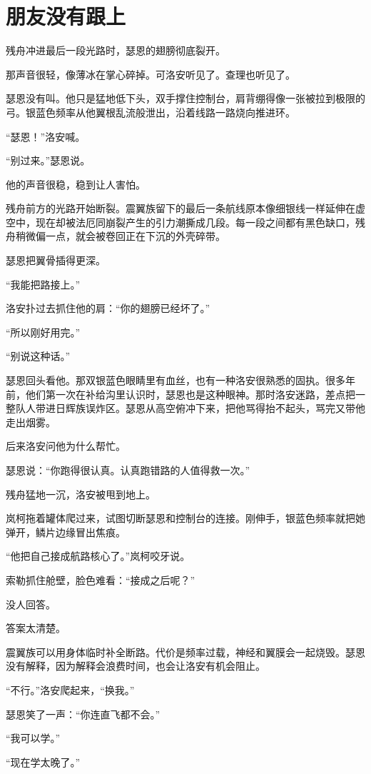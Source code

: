 \chapter{朋友没有跟上}

残舟冲进最后一段光路时，瑟恩的翅膀彻底裂开。

那声音很轻，像薄冰在掌心碎掉。可洛安听见了。查理也听见了。

瑟恩没有叫。他只是猛地低下头，双手撑住控制台，肩背绷得像一张被拉到极限的弓。银蓝色频率从他翼根乱流般泄出，沿着线路一路烧向推进环。

“瑟恩！”洛安喊。

“别过来。”瑟恩说。

他的声音很稳，稳到让人害怕。

残舟前方的光路开始断裂。震翼族留下的最后一条航线原本像细银线一样延伸在虚空中，现在却被法厄同崩裂产生的引力潮撕成几段。每一段之间都有黑色缺口，残舟稍微偏一点，就会被卷回正在下沉的外壳碎带。

瑟恩把翼骨插得更深。

“我能把路接上。”

洛安扑过去抓住他的肩：“你的翅膀已经坏了。”

“所以刚好用完。”

“别说这种话。”

瑟恩回头看他。那双银蓝色眼睛里有血丝，也有一种洛安很熟悉的固执。很多年前，他们第一次在补给沟里认识时，瑟恩也是这种眼神。那时洛安迷路，差点把一整队人带进日辉族误炸区。瑟恩从高空俯冲下来，把他骂得抬不起头，骂完又带他走出烟雾。

后来洛安问他为什么帮忙。

瑟恩说：“你跑得很认真。认真跑错路的人值得救一次。”

残舟猛地一沉，洛安被甩到地上。

岚柯拖着罐体爬过来，试图切断瑟恩和控制台的连接。刚伸手，银蓝色频率就把她弹开，鳞片边缘冒出焦痕。

“他把自己接成航路核心了。”岚柯咬牙说。

索勒抓住舱壁，脸色难看：“接成之后呢？”

没人回答。

答案太清楚。

震翼族可以用身体临时补全断路。代价是频率过载，神经和翼膜会一起烧毁。瑟恩没有解释，因为解释会浪费时间，也会让洛安有机会阻止。

“不行。”洛安爬起来，“换我。”

瑟恩笑了一声：“你连直飞都不会。”

“我可以学。”

“现在学太晚了。”

